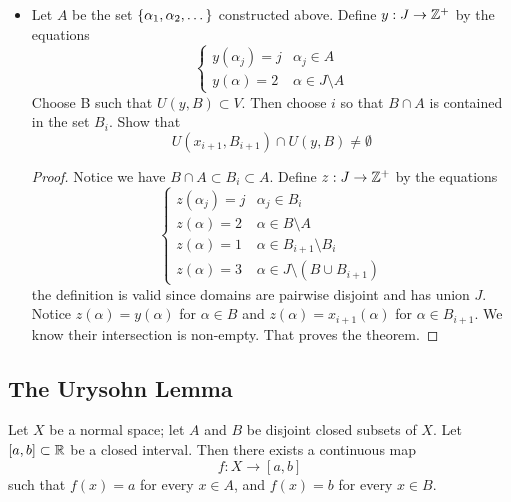 \documentclass[12pt,a4paper]{article}
\begin{document}
\begin{ex}
\begin{itemize}
\begin{proof}
                Inductively, for $i=k$ after defining $n_i$ and $B_i$ for $i<k$, $x_k$ is known by the given equation. Since $U$ is a neighborhood of $x_k$, there is finite $C$ such that $x_k\in U(x_k,C)\subset U$. Let $B_k=B_{k-1}\cup C$, $n_k=\abs{B_k}$, $\set{\alpha_{n_{k-1}+1},\alpha_{n_k}}=B_k\setminus B_{k-1}$, it follows that
                $$
                x_k\in U(x_k,B_k)\subset U(x_k,C)\subset U
                $$
            \end{proof}
            \item Let $A$ be the set $\left\{\alpha_1,\alpha_2,\dots\right\}$ constructed above. Define $y:J\to\mathbb{Z}^+$ by the equations
            $$
            \begin{cases}
                y(\alpha_j)=j & \alpha_j\in A\\
                y(\alpha)=2 & \alpha\in J\setminus A
            \end{cases}
            $$
            Choose B such that $U(y,B)\subset V$. Then choose $i$ so that $B\cap A$ is contained in the set $B_i$. Show that 
            $$
            U(x_{i+1},B_{i+1})\cap U(y,B)\neq\emptyset
            $$
            \begin{proof}
                Notice we have $B\cap A\subset B_i\subset A$. Define $z:J\to\mathbb{Z}^+$ by the equations
                $$
                \begin{cases}
                    z(\alpha_j)=j & \alpha_j\in B_i\\
                    z(\alpha)=2 & \alpha\in B\setminus A\\
                    z(\alpha)=1 & \alpha\in B_{i+1}\setminus B_i\\
                    z(\alpha)=3 & \alpha\in J\setminus(B\cup B_{i+1})
                \end{cases}
                $$
                the definition is valid since domains are pairwise disjoint and has union $J$. Notice $z(\alpha)=y(\alpha)$ for $\alpha\in B$ and $z(\alpha)=x_{i+1}(\alpha)$ for $\alpha\in B_{i+1}$. We know their intersection is non-empty. That proves the theorem.  
            \end{proof}
        \end{itemize}
    \end{ex}
    \hfill

    \subsection{The Urysohn Lemma}
    \begin{lemma}
        Let $X$ be a normal space; let $A$ and $B$ be disjoint closed subsets of $X$. Let $[a,b]\subset\mathbb{R}$ be a closed interval. Then there exists a continuous map
        $$
        f:X\to [a,b]
        $$
        such that $f(x)=a$ for every $x\in A$, and $f(x)=b$ for every $x\in B$.
    \end{lemma}
    \hfill
\end{document}
